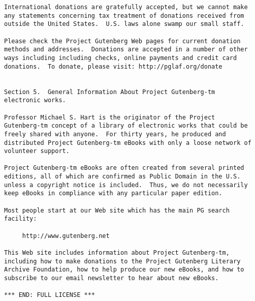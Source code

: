 \documentclass[letterpaper,12pt,oneside,openany]{memoir}
\begin{document}
\begin{verbatim}
International donations are gratefully accepted, but we cannot make
any statements concerning tax treatment of donations received from
outside the United States.  U.S. laws alone swamp our small staff.

Please check the Project Gutenberg Web pages for current donation
methods and addresses.  Donations are accepted in a number of other
ways including including checks, online payments and credit card
donations.  To donate, please visit: http://pglaf.org/donate


Section 5.  General Information About Project Gutenberg-tm
electronic works.

Professor Michael S. Hart is the originator of the Project
Gutenberg-tm concept of a library of electronic works that could be
freely shared with anyone.  For thirty years, he produced and
distributed Project Gutenberg-tm eBooks with only a loose network of
volunteer support.

Project Gutenberg-tm eBooks are often created from several printed
editions, all of which are confirmed as Public Domain in the U.S.
unless a copyright notice is included.  Thus, we do not necessarily
keep eBooks in compliance with any particular paper edition.

Most people start at our Web site which has the main PG search
facility:

     http://www.gutenberg.net

This Web site includes information about Project Gutenberg-tm,
including how to make donations to the Project Gutenberg Literary
Archive Foundation, how to help produce our new eBooks, and how to
subscribe to our email newsletter to hear about new eBooks.

*** END: FULL LICENSE ***
\end{verbatim}
\end{document}
